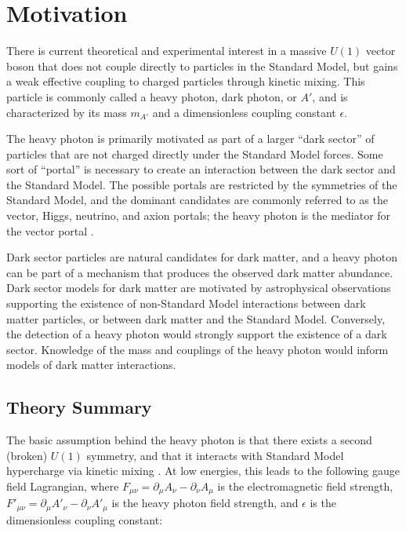 \chapter{Motivation}
There is current theoretical and experimental interest in a massive $U(1)$ vector boson that does not couple directly to particles in the Standard Model, but gains a weak effective coupling to charged particles through kinetic mixing.
This particle is commonly called a heavy photon, dark photon, or $A'$, and is characterized by its mass $m_{A'}$ and a dimensionless coupling constant $\epsilon$.

The heavy photon is primarily motivated as part of a larger ``dark sector'' of particles that are not charged directly under the Standard Model forces.
Some sort of ``portal'' is necessary to create an interaction between the dark sector and the Standard Model.
The possible portals are restricted by the symmetries of the Standard Model, and the dominant candidates are commonly referred to as the vector, Higgs, neutrino, and axion portals; the heavy photon is the mediator for the vector portal \cite{essig_dark_2013}.

Dark sector particles are natural candidates for dark matter, and a heavy photon can be part of a mechanism that produces the observed dark matter abundance.
Dark sector models for dark matter are motivated by astrophysical observations supporting the existence of non-Standard Model interactions between dark matter particles, or between dark matter and the Standard Model.
Conversely, the detection of a heavy photon would strongly support the existence of a dark sector.
Knowledge of the mass and couplings of the heavy photon would inform models of dark matter interactions.

%

\section{Theory Summary}
The basic assumption behind the heavy photon is that there exists a second (broken) $U(1)$ symmetry, and that it interacts with Standard Model hypercharge via kinetic mixing \cite{holdom_two_1986}.
At low energies, this leads to the following gauge field Lagrangian, where $F_{\mu\nu}=\partial_\mu A_\nu - \partial_\nu A_\mu$ is the electromagnetic field strength, $F'_{\mu\nu} = \partial_\mu A'_\nu - \partial_\nu A'_\mu$ is the heavy photon field strength, and $\epsilon$ is the dimensionless coupling constant:

